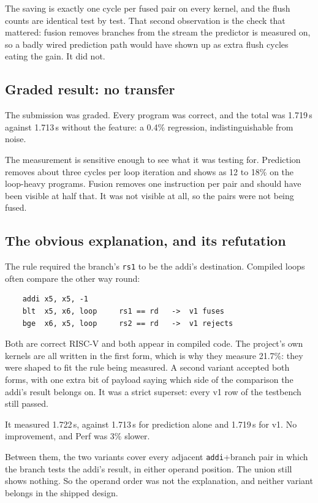 \documentclass[11pt]{article}
\begin{document}
The saving is exactly one cycle per fused pair on every kernel, and the flush counts are
identical test by test. That second observation is the check that mattered: fusion removes
branches from the stream the predictor is measured on, so a badly wired prediction path would
have shown up as extra flush cycles eating the gain. It did not.

\subsection{Graded result: no transfer}

The submission was graded. Every program was correct, and the total was 1.719\,s against
1.713\,s without the feature: a 0.4\% regression, indistinguishable from noise.

The measurement is sensitive enough to see what it was testing for. Prediction removes about
three cycles per loop iteration and shows as 12 to 18\% on the loop-heavy programs. Fusion
removes one instruction per pair and should have been visible at half that. It was not visible
at all, so the pairs were not being fused.

\subsection{The obvious explanation, and its refutation}

The rule required the branch's \texttt{rs1} to be the addi's destination. Compiled loops often
compare the other way round:

\begin{verbatim}
    addi x5, x5, -1
    blt  x5, x6, loop     rs1 == rd   ->  v1 fuses
    bge  x6, x5, loop     rs2 == rd   ->  v1 rejects
\end{verbatim}

Both are correct RISC-V and both appear in compiled code. The project's own kernels are all
written in the first form, which is why they measure 21.7\%: they were shaped to fit the rule
being measured. A second variant accepted both forms, with one extra bit of payload saying
which side of the comparison the addi's result belongs on. It was a strict superset: every v1
row of the testbench still passed.

It measured 1.722\,s, against 1.713\,s for prediction alone and 1.719\,s for v1. No
improvement, and Perf was 3\% slower.

Between them, the two variants cover every adjacent \texttt{addi}+branch pair in which the
branch tests the addi's result, in either operand position. The union still shows nothing. So
the operand order was not the explanation, and neither variant belongs in the shipped design.
\end{document}
